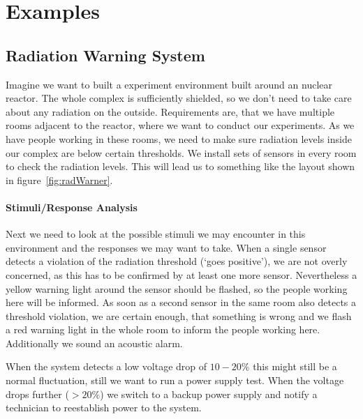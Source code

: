 \documentclass[10pt,a4paper,titlepage,draft]{article} %
\begin{document}
\section{Examples}

\subsection{Radiation Warning System}
Imagine we want to built a experiment environment built around an nuclear reactor.
The whole complex is sufficiently shielded, so we don't need to take care about any radiation on the outside.
Requirements are, that we have multiple rooms adjacent to the reactor, where we want to conduct our experiments.
As we have people working in these rooms, we need to make sure radiation levels inside our complex are below certain thresholds.
We install sets of sensors in every room to check the radiation levels.
This will lead us to something like the layout shown in figure~\ref{fig:radWarner}.

\paragraph{Stimuli/Response Analysis}
Next we need to look at the possible stimuli we may encounter in this environment and the responses we may want to take.
When a single sensor detects a violation of the radiation threshold (`goes positive'), we are not overly concerned, as this has to be confirmed by at least one more sensor.
Nevertheless a yellow warning light around the sensor should be flashed, so the people working here will be informed.
As soon as a second sensor in the same room also detects a threshold violation, we are certain enough, that something is wrong and we flash a red warning light in the whole room to inform the people working here.
Additionally we sound an acoustic alarm.

When the system detects a low voltage drop of $10-20\%$ this might still be a normal fluctuation, still we want to run a power supply test.
When the voltage drops further ($>20\%$) we switch to a backup power supply and notify a technician to reestablish power to the system.
\end{document}

